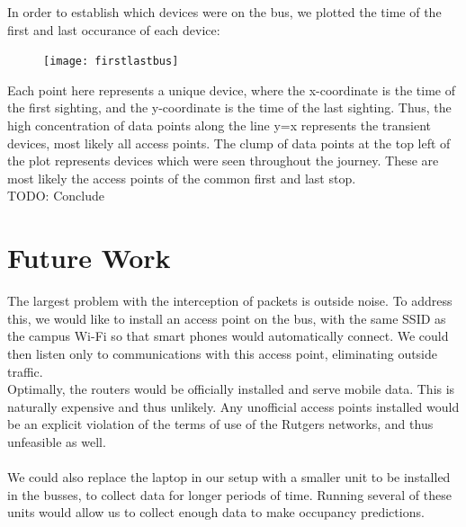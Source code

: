 \documentclass[letterpaper]{scrartcl}
\begin{document}
	In order to establish which devices were on the bus, we plotted the time of the first and last occurance of each device:


	\begin{figure}[H]
	\texttt{[image: firstlastbus]}
	\centering
	\end{figure}

	Each point here represents a unique device, where the x-coordinate is the time of the first sighting, and the y-coordinate is the time of the last sighting.
	Thus, the high concentration of data points along the line y=x represents the transient devices, most likely all access points.
	The clump of data points at the top left of the plot represents devices which were seen throughout the journey. These are most likely the access points of the common first and last stop.
	\\

	TODO: Conclude


\section*{Future Work}
The largest problem with the interception of packets is outside noise.
To address this, we would like to install an access point on the bus, with the same SSID as the campus Wi-Fi so that smart phones would automatically connect.
We could then listen only to communications with this access point, eliminating outside traffic.
\\
Optimally, the routers would be officially installed and serve mobile data. This is naturally expensive and thus unlikely. Any unofficial access points installed would be an explicit violation of the terms of use of the Rutgers networks, and thus unfeasible as well.
\\
\\
We could also replace the laptop in our setup with a smaller unit to be installed in the busses, to collect data for longer periods of time. Running several of these units would allow us to collect enough data to make occupancy predictions.
\end{document}
